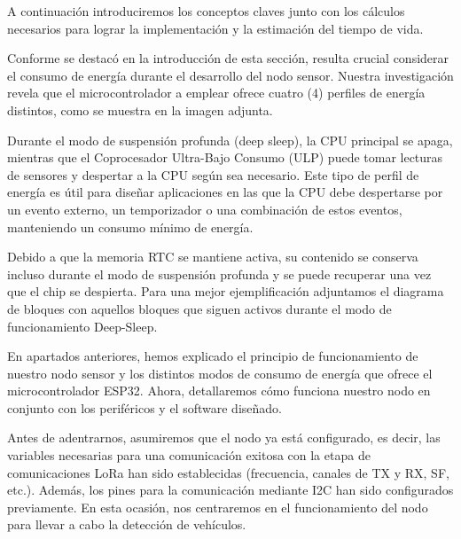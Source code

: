 A continuación introduciremos los conceptos claves junto con los cálculos necesarios
para lograr la implementación y la estimación del tiempo de vida.

Conforme se destacó en la introducción de esta sección, resulta crucial considerar el
consumo de energía durante el desarrollo del nodo sensor. Nuestra investigación revela
que el microcontrolador a emplear ofrece cuatro (4) perfiles de energía distintos, como
se muestra en la imagen adjunta.


Durante el modo de suspensión profunda (deep sleep), la CPU principal se apaga, mientras
que el Coprocesador Ultra-Bajo Consumo (ULP) puede tomar lecturas de sensores y
despertar a la CPU según sea necesario. Este tipo de perfil de energía es útil para
diseñar aplicaciones en las que la CPU debe despertarse por un evento externo, un
temporizador o una combinación de estos eventos, manteniendo un consumo mínimo de
energía.

Debido a que la memoria RTC se mantiene activa, su contenido se conserva incluso durante
el modo de suspensión profunda y se puede recuperar una vez que el chip se despierta.
Para una mejor ejemplificación adjuntamos el diagrama de bloques con aquellos bloques
que siguen activos durante el modo de funcionamiento Deep-Sleep.


En apartados anteriores, hemos explicado el principio de funcionamiento de nuestro nodo
sensor y los distintos modos de consumo de energía que ofrece el microcontrolador ESP32.
Ahora, detallaremos cómo funciona nuestro nodo en conjunto con los periféricos y el
software diseñado.

Antes de adentrarnos, asumiremos que el nodo ya está configurado, es decir, las
variables necesarias para una comunicación exitosa con la etapa de comunicaciones LoRa
han sido establecidas (frecuencia, canales de TX y RX, SF, etc.). Además, los pines para
la comunicación mediante I2C han sido configurados previamente. En esta ocasión, nos
centraremos en el funcionamiento del nodo para llevar a cabo la detección de vehículos.

